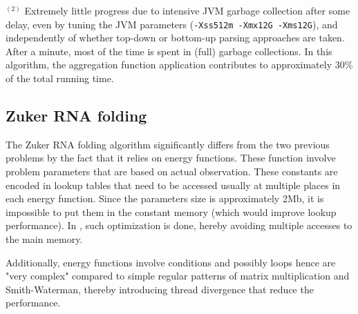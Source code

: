 $^{(2)}$ Extremely little progress due to intensive JVM garbage collection after some delay, even by tuning the JVM parameters ({\tt -Xss512m -Xmx12G -Xms12G}), and independently of whether top-down or bottom-up parsing approaches are taken. After a minute, most of the time is spent in (full) garbage collections. In this algorithm, the aggregation function application contributes to approximately 30\% of the total running time.

\subsection{Zuker RNA folding}

The Zuker RNA folding algorithm significantly differs from the two previous problems by the fact that it relies on energy functions. These function involve problem parameters that are based on actual observation. These constants are encoded in lookup tables that need to be accessed usually at multiple places in each energy function. Since the parameters size is approximately 2Mb, it is impossible to put them in the constant memory (which would improve lookup performance). In \cite{gpu_rnafold}, such optimization is done, hereby avoiding multiple accesses to the main memory.

Additionally, energy functions involve conditions and possibly loops hence are "very complex" compared to simple regular patterns of matrix multiplication and Smith-Waterman, thereby introducing thread divergence that reduce the performance.


